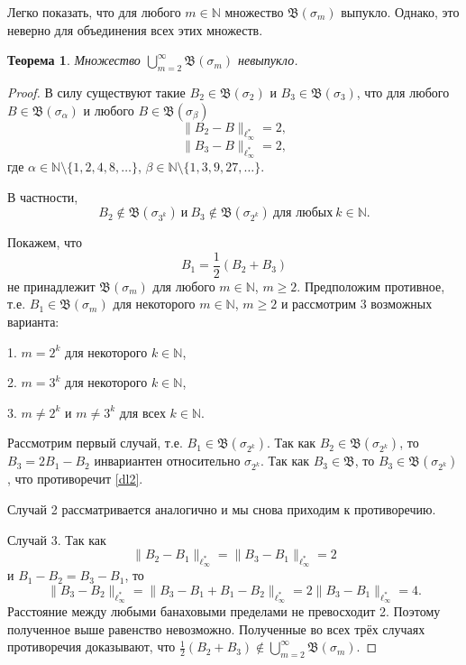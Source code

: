 \documentclass[12pt]{article}
\newtheorem{thm}{Теорема}
\def\N{{\mathbb{N}}}
\begin{document}
Легко показать, что для любого $m\in \N$ множество $\mathfrak B(\sigma_m)$ выпукло. Однако, это неверно для объединения всех этих множеств.

 \begin{thm}
  Множество $\bigcup_{m=2}^\infty\mathfrak B(\sigma_m)$ невыпукло.
 \end{thm}

\begin{proof}
В силу \cite[Теорема 10]{ASSU2} существуют такие $B_2\in \mathfrak B(\sigma_2)$ и $B_3\in \mathfrak B(\sigma_3)$,
что для любого $B\in \mathfrak B(\sigma_\alpha)$ и любого $B\in \mathfrak B(\sigma_\beta)$
\begin{equation}\label{dl1}
\|B_2-B\|_{\ell_\infty^*}=2,
\end{equation}
\begin{equation}\label{dl11}
\|B_3-B\|_{\ell_\infty^*}=2,
\end{equation}
где $\alpha\in \N \setminus \{1,2,4,8,\dots\}$, $\beta\in \N \setminus \{1,3,9,27,\dots\}$.

В частности,
\begin{equation}\label{dl2}
B_2 \notin \mathfrak B(\sigma_{3^k}) \ \text{и} \ B_3 \notin \mathfrak B(\sigma_{2^k}) \ \text{для любых} \ k\in \N.
\end{equation}

Покажем, что
$$B_1 = \frac12(B_2+B_3)$$
не принадлежит $\mathfrak B(\sigma_m)$ для любого $m\in \N$, $m\geqslant 2$. Предположим противное, т.е. $B_1 \in\mathfrak B(\sigma_m)$ для некоторого $m\in \N$, $m\geqslant2$ и рассмотрим 3 возможных варианта:

1. $m=2^k$ для некоторого $k\in \N$,

2. $m=3^k$ для некоторого $k\in \N$,

3. $m\neq 2^k$ и $m\neq 3^k$ для всех $k\in \N$.

Рассмотрим первый случай, т.е. $B_1 \in\mathfrak B(\sigma_{2^k})$. Так как $B_2 \in\mathfrak B(\sigma_{2^k})$, то  $B_3=2B_1-B_2$ инвариантен относительно $\sigma_{2^k}$. Так как $B_3 \in\mathfrak B$, то $B_3 \in\mathfrak B(\sigma_{2^k})$, что противоречит \eqref{dl2}.

Случай 2 рассматривается аналогично и мы снова приходим к противоречию.

Случай 3. Так как
$$\|B_2-B_1\|_{\ell_\infty^*}=\|B_3-B_1\|_{\ell_\infty^*}=2$$
и $B_1-B_2=B_3-B_1$, то
$$\|B_3-B_2\|_{\ell_\infty^*}=\|B_3-B_1+B_1-B_2\|_{\ell_\infty^*}=2\|B_3-B_1\|_{\ell_\infty^*}=4.$$
Расстояние между любыми банаховыми пределами не превосходит 2. Поэтому полученное выше равенство невозможно. Полученные во всех трёх случаях противоречия доказывают, что $\frac12(B_2+B_3)\notin \bigcup_{m=2}^\infty\mathfrak B(\sigma_m)$.
\end{proof}
\end{document}
